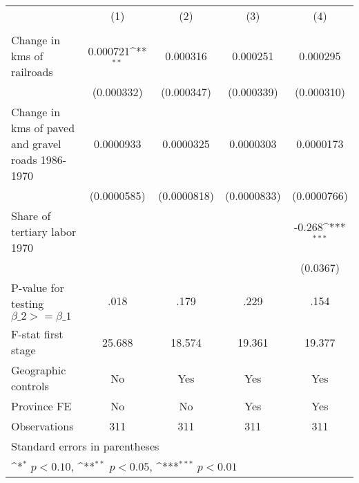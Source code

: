 {
\def\sym#1{\ifmmode^{#1}\else\(^{#1}\)\fi}
\begin{tabular}{l*{4}{c}}
\hline\hline
                &\multicolumn{1}{c}{(1)}&\multicolumn{1}{c}{(2)}&\multicolumn{1}{c}{(3)}&\multicolumn{1}{c}{(4)}\\
                &\multicolumn{1}{c}{}&\multicolumn{1}{c}{}&\multicolumn{1}{c}{}&\multicolumn{1}{c}{}\\
\hline
Change in kms of railroads& 0.000721\sym{**} & 0.000316         & 0.000251         & 0.000295         \\
                &(0.000332)         &(0.000347)         &(0.000339)         &(0.000310)         \\
[1em]
Change in kms of paved and gravel roads 1986-1970&0.0000933         &0.0000325         &0.0000303         &0.0000173         \\
                &(0.0000585)         &(0.0000818)         &(0.0000833)         &(0.0000766)         \\
[1em]
Share of tertiary labor 1970&                  &                  &                  &   -0.268\sym{***}\\
                &                  &                  &                  & (0.0367)         \\
\hline
P-value for testing $\beta\_{2} >= \beta\_{1}$&     .018         &     .179         &     .229         &     .154         \\
F-stat first stage&   25.688         &   18.574         &   19.361         &   19.377         \\
Geographic controls&       No         &      Yes         &      Yes         &      Yes         \\
Province FE     &       No         &       No         &      Yes         &      Yes         \\
Observations    &      311         &      311         &      311         &      311         \\
\hline\hline
\multicolumn{5}{l}{\footnotesize Standard errors in parentheses}\\
\multicolumn{5}{l}{\footnotesize \sym{*} \(p<0.10\), \sym{**} \(p<0.05\), \sym{***} \(p<0.01\)}\\
\end{tabular}
}

